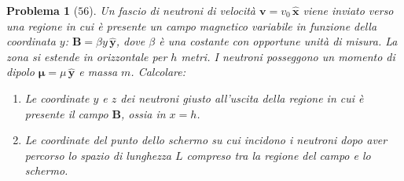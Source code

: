 \documentclass[a4paper,oneside]{article}
\newtheorem{problema}{Problema}
\renewcommand{\vec}[1]{\mathbf{#1}}
\renewcommand{\hat}[1]{\widehat{\mathbf{#1}}}
\begin{document}
\begin{problema}[$56$] 
	Un fascio di neutroni di velocità $\vec{v} = v_{0}\,\hat{x}$ 
	viene inviato verso una regione in cui è presente un campo 
	magnetico variabile in funzione della coordinata $y$: 
	$\vec{B} = \beta y\,\hat{y}$, dove $\beta$ è una 
	costante con  opportune unità di misura. La zona si 
	estende in orizzontale per $h$ metri. I neutroni 
	posseggono un momento di dipolo $\vec{\mu} 
	= \mu\,\hat{y}$ e massa $m$. Calcolare:
	\begin{enumerate}
		\item Le coordinate $y$ e $z$ dei neutroni 
		giusto all'uscita della regione in cui è presente 
		il campo $\vec{B}$, ossia in $x=h$.
		\item Le coordinate del punto dello schermo 
		su cui incidono i neutroni dopo aver percorso lo 
		spazio di lunghezza $L$ compreso tra la regione 
		del campo e lo schermo.
	\end{enumerate}
\end{problema}
\end{document}
